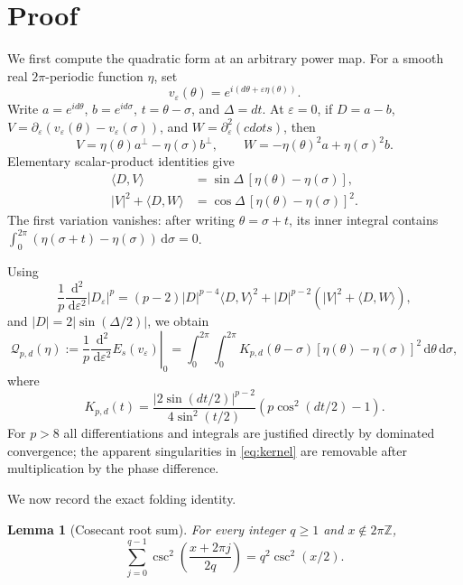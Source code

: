 \documentclass[11pt]{article}
\newtheorem{lemma}{Lemma}
\newcommand{\dd}{\,\mathrm d}
\begin{document}
\section{Proof}

We first compute the quadratic form at an arbitrary power map.  For a smooth
real $2\pi$-periodic function $\eta$, set
\[
 v_\varepsilon(\theta)=e^{i(d\theta+\varepsilon\eta(\theta))}.
\]
Write $a=e^{id\theta}$, $b=e^{id\sigma}$,
$t=\theta-\sigma$, and $\Delta=dt$.  At $\varepsilon=0$, if
$D=a-b$, $V=\partial_\varepsilon(v_\varepsilon(\theta)-
v_\varepsilon(\sigma))$, and $W=\partial_\varepsilon^2(cdots)$, then
\[
 V=\eta(\theta)a^\perp-\eta(\sigma)b^\perp,
 \qquad
 W=-\eta(\theta)^2a+\eta(\sigma)^2b.
\]
Elementary scalar-product identities give
\begin{align*}
 \langle D,V\rangle
 &=\sin\Delta\,[\eta(\theta)-\eta(\sigma)],\\
 |V|^2+\langle D,W\rangle
 &=\cos\Delta\,[\eta(\theta)-\eta(\sigma)]^2.
\end{align*}
The first variation vanishes: after writing $\theta=\sigma+t$, its inner
integral contains
$\int_0^{2\pi}(\eta(\sigma+t)-\eta(\sigma))\dd\sigma=0$.

Using
\[
 \frac1p\frac{\dd^2}{\dd\varepsilon^2}|D_\varepsilon|^p
 =(p-2)|D|^{p-4}\langle D,V\rangle^2
 +|D|^{p-2}(|V|^2+\langle D,W\rangle),
\]
and $|D|=2|\sin(\Delta/2)|$, we obtain
\begin{equation}\label{eq:Qkernel}
 \mathcal Q_{p,d}(\eta)
 :=\left.\frac1p\frac{\dd^2}{\dd\varepsilon^2}
 E_s(v_\varepsilon)\right|_{0}
 =\int_0^{2\pi}\!\int_0^{2\pi}
 K_{p,d}(\theta-\sigma)
 [\eta(\theta)-\eta(\sigma)]^2\dd\theta\dd\sigma,
\end{equation}
where
\begin{equation}\label{eq:kernel}
 K_{p,d}(t)=
 \frac{|2\sin(dt/2)|^{p-2}}
 {4\sin^2(t/2)}\left(p\cos^2(dt/2)-1\right).
\end{equation}
For $p>8$ all differentiations and integrals are justified directly by
dominated convergence; the apparent singularities in \eqref{eq:kernel} are
removable after multiplication by the phase difference.

We now record the exact folding identity.

\begin{lemma}[Cosecant root sum]\label{lem:rootsum}
For every integer $q\ge1$ and $x\notin2\pi\mathbb Z$,
\begin{equation}\label{eq:rootsum}
 \sum_{j=0}^{q-1}
 \csc^2\!\left(\frac{x+2\pi j}{2q}\right)
 =q^2\csc^2(x/2).
\end{equation}
\end{lemma}
\end{document}
